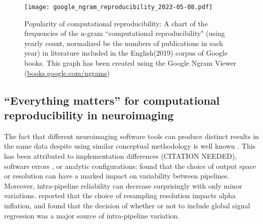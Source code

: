 \begin{figure}
	\centering
	\texttt{[image: google\_ngram\_reproducibility\_2023-05-08.pdf]}
	\caption[Computational reproducibility in the literature]{Popularity of computational reproducibility: A chart of the frequencies of the n-gram ``computational reproducibility" (using yearly count, normalized be the numbers of publications in each year) in literature included in the English(2019) corpus of Google books. This graph has been created using the Google Ngram Viewer (\href{https://books.google.com/ngrams/info}{books.google.com/ngrams}) \citep{michel2011quantitative}}
	\label{fig:ngram}
\end{figure}


\subsection{``Everything matters'' for computational reproducibility in neuroimaging}



The fact that different neuroimaging software tools can produce distinct results in the same data despite using similar conceptual methodology is well known \citep{bowring2019exploring}.
This has been attributed to implementation differences (CITATION NEEDED), software errors \citep{eklund2016cluster}, or analytic configurations: \citet{li2021moving} found that the choice of output space or resolution can have a marked impact on variability between pipelines.
Moreover, intra-pipeline reliability can decrease surprisingly with only minor variations. \citet{mueller2017commentary} reported that the choice of resampling resolution impacts alpha inflation, and \citet{li2021moving} found that the decision of whether or not to include global signal regression was a major source of intra-pipeline variation.



